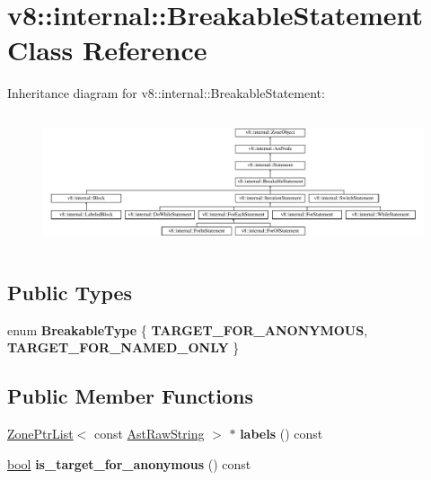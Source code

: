 \hypertarget{classv8_1_1internal_1_1BreakableStatement}{}\section{v8\+:\+:internal\+:\+:Breakable\+Statement Class Reference}
\label{classv8_1_1internal_1_1BreakableStatement}
Inheritance diagram for v8\+:\+:internal\+:\+:Breakable\+Statement\+:\begin{figure}[H]
\begin{center}
\leavevmode
\includegraphics[height=3.939698cm]{classv8_1_1internal_1_1BreakableStatement}
\end{center}
\end{figure}
\subsection*{Public Types}
\begin{DoxyCompactItemize}
\item 
\mbox{\label{classv8_1_1internal_1_1BreakableStatement_a52c50b4c3f6fd7f2ee085a03d6ab0f5d}} 
enum {\bfseries Breakable\+Type} \{ {\bfseries T\+A\+R\+G\+E\+T\+\_\+\+F\+O\+R\+\_\+\+A\+N\+O\+N\+Y\+M\+O\+US}, 
{\bfseries T\+A\+R\+G\+E\+T\+\_\+\+F\+O\+R\+\_\+\+N\+A\+M\+E\+D\+\_\+\+O\+N\+LY}
 \}
\end{DoxyCompactItemize}
\subsection*{Public Member Functions}
\begin{DoxyCompactItemize}
\item 
\mbox{\label{classv8_1_1internal_1_1BreakableStatement_a8718e04578ba7bf3bd988cd2f9d980d3}} 
\mbox{\hyperlink{classv8_1_1internal_1_1ZoneList}{Zone\+Ptr\+List}}$<$ const \mbox{\hyperlink{classv8_1_1internal_1_1AstRawString}{Ast\+Raw\+String}} $>$ $\ast$ {\bfseries labels} () const
\item 
\mbox{\label{classv8_1_1internal_1_1BreakableStatement_af7ba840d9270c2abf29549cd0c085e35}} 
\mbox{\hyperlink{classbool}{bool}} {\bfseries is\+\_\+target\+\_\+for\+\_\+anonymous} () const
\end{DoxyCompactItemize}
